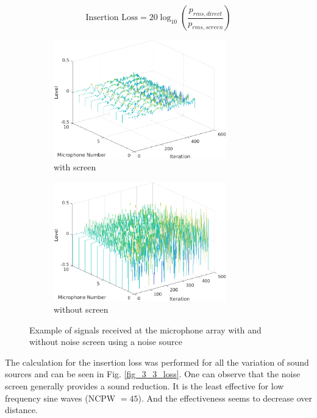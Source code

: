 \documentclass[twocolumn]{article}
\begin{document}
\begin{equation}
    \text{Insertion Loss} = 20\log_{10}\left(\frac{p_{rms,direct}}{p_{rms,screen}}\right)
\end{equation}

\begin{figure}[H]
    \begin{subfigure}[]{75mm}
        \centering
        \includegraphics[width=75mm]{./Images/3_3_noise_noise_screen_3D.png}
        \caption{with screen}
        \label{fig_3_3_screen}
    \end{subfigure}
    \begin{subfigure}[]{75mm}
        \centering
        \includegraphics[width=75mm]{./Images/3_3_noise_no_screen_3D.png}
        \caption{without screen}
        \label{fig_3_3_no_screen}
    \end{subfigure}
    \caption{Example of signals received at the microphone array with and without noise screen using a noise source}
    \label{fig_3_3_3d}
\end{figure}

The calculation for the insertion loss was performed for all the variation of
sound sources and can be seen in Fig. \ref{fig_3_3_loss}.
One can observe that the noise screen generally provides a sound reduction.
It is the least effective for low frequency sine waves (NCPW $= 45$).
And the effectiveness seems to decrease over distance.
\end{document}
